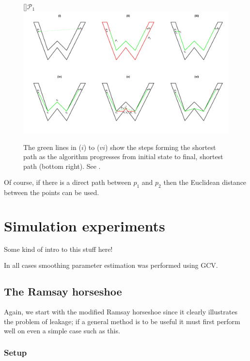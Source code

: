 \begin{figure}
\centering
[]{$\mathcal{P}_1$}
\includegraphics[trim=0in 0.5in 0in 0.25in, width=9.5in]{mds/figs/wdia.pdf} \\
\caption{The green lines in ($i$) to ($vi$) show the steps forming the shortest path as the algorithm progresses from initial state to final, shortest path (bottom right). See .}
\label{wdia}
\end{figure}

Of course, if there is a direct path between $p_1$ and $p_2$ then the Euclidean distance between the points can be used.

\section{Simulation experiments}
\label{mdssims}

Some kind of intro to this stuff here!

In all cases smoothing parameter estimation was performed using GCV.



\subsection{The Ramsay horseshoe}

Again, we start with the modified Ramsay horseshoe since it clearly illustrates the problem of leakage; if a general method is to be useful it must first perform well on even a simple case such as this.

\subsubsection{Setup}

